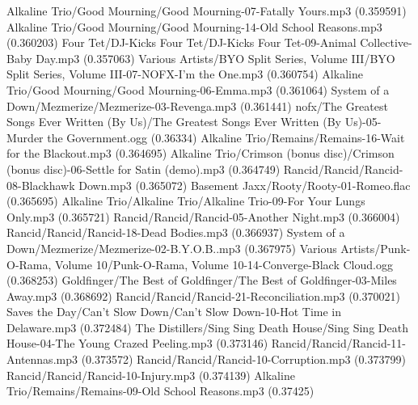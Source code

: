 \begin{listing}{1}
Alkaline Trio/Good Mourning/Good Mourning-07-Fatally Yours.mp3 (0.359591)
Alkaline Trio/Good Mourning/Good Mourning-14-Old School Reasons.mp3 (0.360203)
Four Tet/DJ-Kicks Four Tet/DJ-Kicks Four Tet-09-Animal Collective-Baby Day.mp3 (0.357063)
Various Artists/BYO Split Series, Volume III/BYO Split Series, Volume III-07-NOFX-I'm the One.mp3 (0.360754)
Alkaline Trio/Good Mourning/Good Mourning-06-Emma.mp3 (0.361064)
System of a Down/Mezmerize/Mezmerize-03-Revenga.mp3 (0.361441)
nofx/The Greatest Songs Ever Written (By Us)/The Greatest Songs Ever Written (By Us)-05-Murder the Government.ogg (0.36334)
Alkaline Trio/Remains/Remains-16-Wait for the Blackout.mp3 (0.364695)
Alkaline Trio/Crimson (bonus disc)/Crimson (bonus disc)-06-Settle for Satin (demo).mp3 (0.364749)
Rancid/Rancid/Rancid-08-Blackhawk Down.mp3 (0.365072)
Basement Jaxx/Rooty/Rooty-01-Romeo.flac (0.365695)
Alkaline Trio/Alkaline Trio/Alkaline Trio-09-For Your Lungs Only.mp3 (0.365721)
Rancid/Rancid/Rancid-05-Another Night.mp3 (0.366004)
Rancid/Rancid/Rancid-18-Dead Bodies.mp3 (0.366937)
System of a Down/Mezmerize/Mezmerize-02-B.Y.O.B..mp3 (0.367975)
Various Artists/Punk-O-Rama, Volume 10/Punk-O-Rama, Volume 10-14-Converge-Black Cloud.ogg (0.368253)
Goldfinger/The Best of Goldfinger/The Best of Goldfinger-03-Miles Away.mp3 (0.368692)
Rancid/Rancid/Rancid-21-Reconciliation.mp3 (0.370021)
Saves the Day/Can't Slow Down/Can't Slow Down-10-Hot Time in Delaware.mp3 (0.372484)
The Distillers/Sing Sing Death House/Sing Sing Death House-04-The Young Crazed Peeling.mp3 (0.373146)
Rancid/Rancid/Rancid-11-Antennas.mp3 (0.373572)
Rancid/Rancid/Rancid-10-Corruption.mp3 (0.373799)
Rancid/Rancid/Rancid-10-Injury.mp3 (0.374139)
Alkaline Trio/Remains/Remains-09-Old School Reasons.mp3 (0.37425)
\end{listing}

